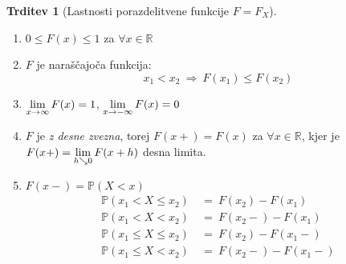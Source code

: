 \documentclass[11pt]{article}
\theoremstyle{definition}
\theoremstyle{definition}
\newtheorem{trditev}{Trditev}[section]
\theoremstyle{definition}
\begin{document}
\begin{trditev}[Lastnosti porazdelitvene funkcije $F = F_X$]
~\\
\begin{enumerate}
	\item $0 \leq F(x) \leq 1$ za $\forall x \in \mathbb{R}$
	\item  $F$ je naraščajoča funkcija:
	$$x_1 < x_2 ~\Rightarrow~ F(x_1) \leq F(x_2)$$
	\item $\mathlarger{\lim_{x \rightarrow \infty} F(x) = 1}$, $\mathlarger{\lim_{x \rightarrow -\infty} F(x) = 0}$
	\item $F$ je \textit{z desne zvezna}, torej $F(x+) = F(x)$ za $\forall x \in \mathbb{R}$, kjer je $\mathlarger{F(x+) = \lim_{h \searrow 0} F(x+h)}$ desna limita.
	\item $F(x-) = \mathbb{P}(X < x)$ 
	\begin{align*}
	\mathbb{P}(x_1 < X \leq x_2) ~&=~ F(x_2) - F(x_1) \\
	\mathbb{P}(x_1 < X < x_2) ~&=~ F(x_2-) - F(x_1) \\
	\mathbb{P}(x_1 \leq X \leq x_2) ~&=~ F(x_2) - F(x_1-) \\
	\mathbb{P}(x_1 \leq X < x_2) ~&=~ F(x_2-) - F(x_1-) 
	\end{align*}
\end{enumerate}
\end{trditev}
\vspace{0.5cm}
\end{document}
